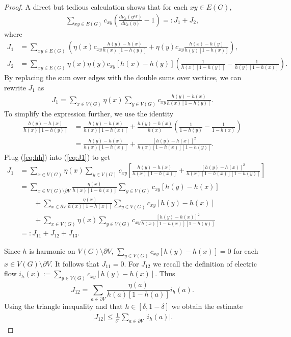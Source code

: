 \documentclass[11pt]{amsart}
\theoremstyle{plain}
\theoremstyle{definition}
\theoremstyle{remark}
\begin{document}
\begin{proof}
A direct but tedious calculation shows that for each $xy\in E(G)$,
\begin{align*}
\sum_{xy\in E(G)} c_{xy}\left(\frac{d\nu_h(\eta^{xy})}{d\nu_h(\eta)}-1\right) =: J_1 + J_2,
\end{align*}
where
\begin{align*}
J_1 &= \sum_{xy\in E(G)} \left(\eta(x) c_{xy} \frac{h(y)-h(x)}{h(x)[1-h(y)]} + \eta(y) c_{xy} \frac{h(x)-h(y)}{h(y)[1-h(x)]}\right),\\
J_2 &= \sum_{xy\in E(G)} \eta(x) \eta(y) c_{xy} \left[h(x)-h(y)\right]\left(\frac{1}{h(x)[1-h(y)]} - \frac{1}{h(y)[1-h(x)]}\right).
\end{align*}
By replacing the sum over edges with the double sums over vertices, we can rewrite $J_1$ as
\begin{align}
\label{eq:J1}
J_1 = \sum_{x\in V(G)} \eta(x) \sum_{y\in V(G)} c_{xy} \frac{h(y)-h(x)}{h(x)[1-h(y)]}.
\end{align}
To simplify the expression further, we use the identity
\begin{align}
\label{eq:hh}
\frac{h(y)-h(x)}{h(x)[1-h(y)]} &= \frac{h(y)-h(x)}{h(x)[1-h(x)]} + \frac{h(y)-h(x)}{h(x)}\left(\frac{1}{1-h(y)}- \frac{1}{1-h(x)}\right)\\
\nonumber &= \frac{h(y)-h(x)}{h(x)[1-h(x)]} +  \frac{[h(y)-h(x)]^2}{h(x)[1-h(x)][1-h(y)]}.
\end{align}
Plug (\ref{eq:hh}) into (\ref{eq:J1}) to get
\begin{align}
\label{J1breakdown}
J_1 &= \sum_{x\in V(G)} \eta(x) \sum_{y\in V(G)} c_{xy} \left[ \frac{h(y)-h(x)}{h(x)[1-h(x)]} + \frac{[h(y)-h(x)]^2}{h(x)[1-h(x)][1-h(y)]}\right] \\
\nonumber &=\sum_{x\in V(G)\setminus\partial V} \frac{\eta(x)}{h(x)[1-h(x)]} \sum_{y\in V(G)} c_{xy} [h(y)-h(x)] \\
& \nonumber \qquad + \sum_{x\in \partial V} \frac{\eta(x)}{h(x)[1-h(x)]} \sum_{y\in V(G)} c_{xy}[h(y)-h(x)] \\
& \nonumber \qquad + \sum_{x\in V(G)} \eta(x) \sum_{y\in V(G)} c_{xy} \frac{[h(y)-h(x)]^2}{h(x)[1-h(x)][1-h(y)]}\\
\nonumber &=: J_{11} + J_{12}+ J_{13}.
\end{align}

Since $h$ is harmonic on $V(G)\setminus \partial V$, $\sum_{y\in V(G)} c_{xy}[h(y)-h(x)]=0$ for each $x\in V(G)\setminus\partial V$. It follows that $J_{11}=0$. For $J_{12}$ we recall the definition of electric flow $i_h(x) := \sum_{y\in V(G)} c_{xy} [h(y)-h(x)]$. Thus
\[
J_{12} =\sum_{a\in \partial V} \frac{\eta(a)}{h(a)[1-h(a)]} i_h(a).
\]
Using the triangle inequality and that $h\in [\delta, 1-\delta]$ we obtain the estimate
\begin{align}
\label{J12}
|J_{12}| \leq \frac{1}{\delta^2} \sum_{a\in \partial V}|i_h(a)|.
\end{align}


\end{proof}
\end{document}
